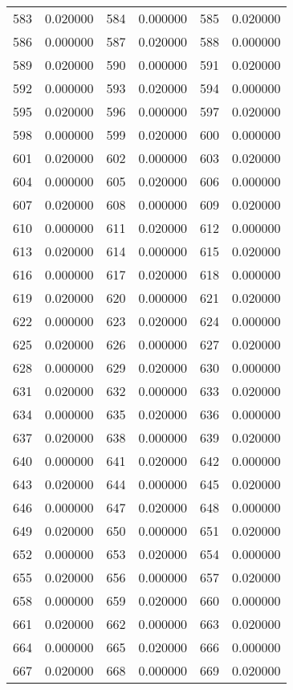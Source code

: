 \documentclass[12pt]{article}
\begin{document}
\begin{longtable}{@{}cc|cc|cc@{}}
583 & 0.020000 & 584 & 0.000000 & 585 & 0.020000 \\
586 & 0.000000 & 587 & 0.020000 & 588 & 0.000000 \\
589 & 0.020000 & 590 & 0.000000 & 591 & 0.020000 \\
592 & 0.000000 & 593 & 0.020000 & 594 & 0.000000 \\
595 & 0.020000 & 596 & 0.000000 & 597 & 0.020000 \\
598 & 0.000000 & 599 & 0.020000 & 600 & 0.000000 \\
601 & 0.020000 & 602 & 0.000000 & 603 & 0.020000 \\
604 & 0.000000 & 605 & 0.020000 & 606 & 0.000000 \\
607 & 0.020000 & 608 & 0.000000 & 609 & 0.020000 \\
610 & 0.000000 & 611 & 0.020000 & 612 & 0.000000 \\
613 & 0.020000 & 614 & 0.000000 & 615 & 0.020000 \\
616 & 0.000000 & 617 & 0.020000 & 618 & 0.000000 \\
619 & 0.020000 & 620 & 0.000000 & 621 & 0.020000 \\
622 & 0.000000 & 623 & 0.020000 & 624 & 0.000000 \\
625 & 0.020000 & 626 & 0.000000 & 627 & 0.020000 \\
628 & 0.000000 & 629 & 0.020000 & 630 & 0.000000 \\
631 & 0.020000 & 632 & 0.000000 & 633 & 0.020000 \\
634 & 0.000000 & 635 & 0.020000 & 636 & 0.000000 \\
637 & 0.020000 & 638 & 0.000000 & 639 & 0.020000 \\
640 & 0.000000 & 641 & 0.020000 & 642 & 0.000000 \\
643 & 0.020000 & 644 & 0.000000 & 645 & 0.020000 \\
646 & 0.000000 & 647 & 0.020000 & 648 & 0.000000 \\
649 & 0.020000 & 650 & 0.000000 & 651 & 0.020000 \\
652 & 0.000000 & 653 & 0.020000 & 654 & 0.000000 \\
655 & 0.020000 & 656 & 0.000000 & 657 & 0.020000 \\
658 & 0.000000 & 659 & 0.020000 & 660 & 0.000000 \\
661 & 0.020000 & 662 & 0.000000 & 663 & 0.020000 \\
664 & 0.000000 & 665 & 0.020000 & 666 & 0.000000 \\
667 & 0.020000 & 668 & 0.000000 & 669 & 0.020000 \\

\end{longtable}
\end{document}
